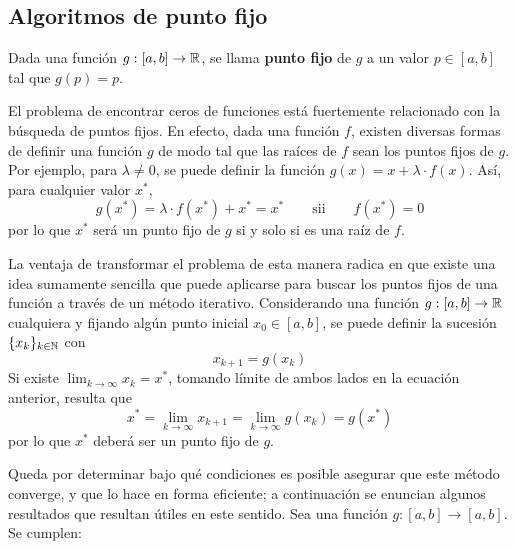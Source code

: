 
\subsection{Algoritmos de punto fijo}

Dada una función $g : [a,b] \to \mathbb{R}$, se llama \textbf{punto fijo} de $g$ a
un valor $p \in [a,b]$ tal que $g(p) = p$.

El problema de encontrar ceros de funciones está fuertemente relacionado con
la búsqueda de puntos fijos. En efecto, dada una función $f$, existen diversas
formas de definir una función $g$ de modo tal que las raíces de $f$ sean los
puntos fijos de $g$. Por ejemplo, para $\lambda \neq 0$, se puede definir la
función $g(x) = x + \lambda \cdot f(x)$. Así, para cualquier valor $x^\ast$,
\[ g(x^\ast) = \lambda \cdot f(x^\ast) + x^\ast = x^\ast
    \qquad \text{sii} \qquad f(x^\ast) = 0 \]
por lo que $x^\ast$ será un punto fijo de $g$ si y solo si es una raíz de $f$.

La ventaja de transformar el problema de esta manera radica en que existe una
idea sumamente sencilla que puede aplicarse para buscar los puntos fijos de
una función a través de un método iterativo. Considerando una función $g :
[a,b] \to \mathbb{R}$ cualquiera y fijando algún punto inicial $x_0 \in [a,b]$, se
puede definir la sucesión $\lbrace x_k \rbrace_{k \in \mathbb{N}}$ con
\[ x_{k+1} = g(x_k) \]
Si existe $\lim_{k \to \infty} x_k = x^\ast$, tomando límite de ambos lados en
la ecuación anterior, resulta que
\[ x^\ast = \lim_{k \to \infty} x_{k+1} = \lim_{k \to \infty} g(x_k) = g(x^\ast) \]
por lo que $x^\ast$ deberá ser un punto fijo de $g$.

Queda por determinar bajo qué condiciones es posible asegurar que este método
converge, y que lo hace en forma eficiente; a continuación se enuncian algunos
resultados que resultan útiles en este sentido. Sea una función $g: [a,b] \to
[a,b]$. Se cumplen:

